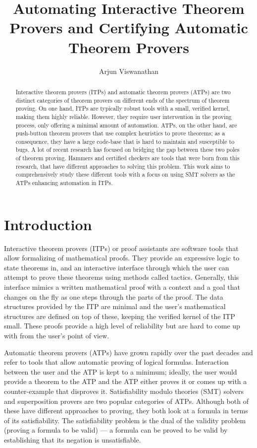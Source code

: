 \documentclass{article}
\begin{document}
\title{Automating Interactive Theorem Provers and Certifying Automatic Theorem Provers}
\author{Arjun Viswanathan}
\date{}
\maketitle
\begin{abstract}
	Interactive theorem provers (ITPs) and automatic 
	theorem provers (ATPs) are two distinct categories 
	of theorem provers on different ends of the spectrum 
	of theorem proving. On one hand, ITPs are typically 
	robust tools with a small, verified kernel, 
	making them highly reliable. However, they 
	require user intervention in the proving process, 
	only offering a minimal amount of automation. ATPs, 
	on the other hand, are push-button theorem provers 
	that use complex heuristics to prove theorems; as a consequence, they have a large code-base that is 
	hard to maintain and susceptible to bugs. A lot of 
	recent research has focused on bridging the gap 
	between these two poles of theorem proving. Hammers 
	and certified checkers are tools that were born from 
	this research, that have different approaches to 
	solving this problem. This work aims to 
	comprehensively study these different tools with a 
	focus on using SMT solvers as the ATPs enhancing 
	automation in ITPs.
\end{abstract}

\section{Introduction}
\label{sec:intro}
	Interactive theorem provers (ITPs) or proof 
	assistants are software tools that allow formalizing 
	of mathematical proofs. They provide an expressive 
	logic to state theorems in, and an interactive 
	interface through which the user can attempt to 
	prove these theorems using methods called tactics. 
	Generally, this interface mimics a written 
	mathematical proof with a context and a goal that 
	changes on the fly as one steps through the parts 
	of the proof. The data structures provided by the 
	ITP are minimal and the user's mathematical 
	structures are defined on top of these, keeping 
	the verified kernel of the ITP small. These proofs 
	provide a high level of reliability	but are hard to 
	come up with from the user's point of view. 
	
	Automatic theorem provers (ATPs) have grown rapidly 
	over the past decades and refer to tools that allow 
	automatic proving of logical formulas. Interaction 
	between the user and the ATP is kept to a minimum; 
	ideally, the user would provide a theorem to the ATP
	and the ATP either proves it or comes up with a counter-example that disproves it. Satisfiability 
	modulo theories (SMT) solvers and superposition 
	provers are two popular categories of ATPs.  
	Although both of these have different approaches to 
	proving, they both look at a formula in terms of 
	its satisfiability. The satisfiability problem is 
	the dual of the validity problem (proving a formula 
	to be valid) --- a formula can be proved to be valid 
	by establishing that its negation is unsatisfiable.
	
\end{document}
